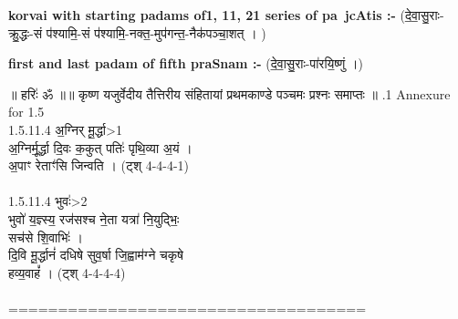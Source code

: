 \documentclass[17pt]{extarticle}
\begin{document}
\textbf{korvai with starting padams of1, 11, 21 series of pa~jcAtis :-} \newline
(दे॒वा॒सु॒राः-क्रु॒द्धः-सं प॑श्यामि॒-सं प॑श्यामि॒-नक्त॒-मुप॑गन्त॒-नैक॑पञ्चा॒शत् । ) \newline

\textbf{first and last padam of fifth praSnam :-} \newline
(दे॒वा॒सु॒राः-पा॑रयि॒ष्णुं ।) \newline 


॥ हरिः॑ ॐ ॥॥ कृष्ण यजुर्वेदीय तैत्तिरीय संहितायां प्रथमकाण्डे पञ्चमः प्रश्नः समाप्तः ॥ \newline
{}.1   Annexure for 1.5\\1.5.11.4 अ॒ग्निर् मू॒र्द्धा>1\\अ॒ग्निर्मू॒र्द्धा दि॒वः क॒कुत् पतिः॑ पृथि॒व्या अ॒यं ।\\अ॒पाꣳ रेताꣳ॑सि जिन्वति । (ट्श् 4-4-4-1)\\\\1.5.11.4 भुवः॑>2\\भुवो॑ य॒ज्ञ्स्य॒ रज॑सश्च ने॒ता यत्रा॑ नि॒युद्भिः॒ \\सच॑से शि॒वाभिः॑ ।\\दि॒वि मू॒र्द्धानं॑ दधिषे सुव॒र्षा जि॒ह्वाम॑ग्ने चकृषे \\हव्य॒वाहं᳚ । (ट्श् 4-4-4-4)\\\\====================================\\
\pagebreak
        
\end{document}

